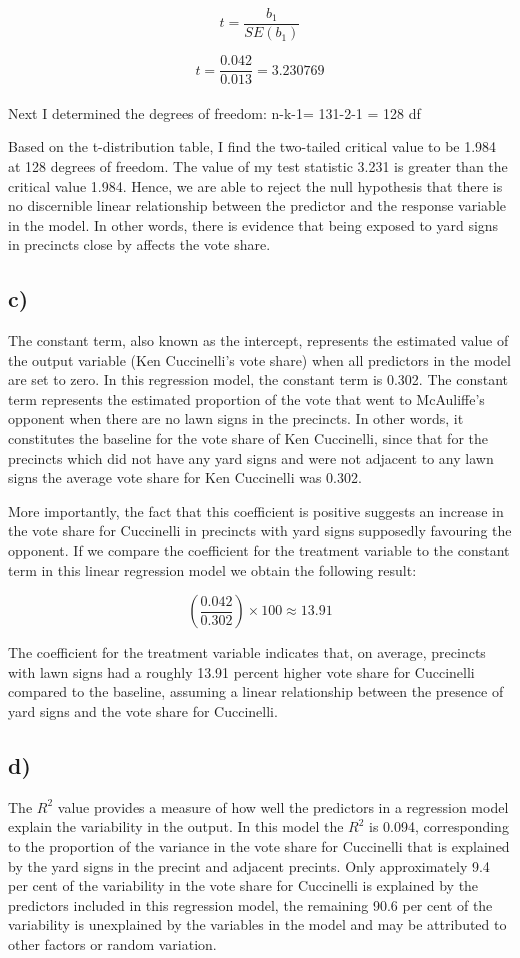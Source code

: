 \documentclass[oneside]{article}
\begin{document}
\[ t = \frac{b_1}{SE(b_1)} \]

\[ t = \frac{0.042}{0.013} = 3.230769\]
\\
Next I determined the degrees of freedom: n-k-1= 131-2-1 = 128 df

Based on the t-distribution table, I find the two-tailed critical value to be 1.984 at 128 degrees of freedom. The value of my test statistic 3.231 is greater than the critical value 1.984. Hence, we are able to reject the null hypothesis that there is no discernible linear relationship between the predictor and the response variable in the model. In other words, there is evidence that being exposed to yard signs in precincts close by affects the vote share.

\subsection*{c)}
The constant term, also known as the intercept, represents the estimated value of the output variable (Ken Cuccinelli's vote share) when all predictors in the model are set to zero. In this regression model, the constant term is 0.302. 
The constant term represents the estimated proportion of the vote that went to McAuliffe's opponent when there are no lawn signs in the precincts.
In other words, it constitutes the baseline for the vote share of Ken Cuccinelli, since that for the precincts which did not have any yard signs and were not adjacent to any lawn signs the average vote share for Ken Cuccinelli was 0.302.

More importantly, the fact that this coefficient is positive suggests an increase in the vote share for Cuccinelli in precincts with yard signs supposedly favouring the opponent. 
If we compare the coefficient for the treatment variable to the constant term in this linear regression model we obtain the following result:

\[
\left( \frac{0.042}{0.302} \right) \times 100 \approx 13.91
\]

The coefficient for the treatment variable indicates that, on average, precincts with lawn signs had a roughly 13.91 percent higher vote share for Cuccinelli compared to the baseline, assuming a linear relationship between the presence of yard signs and the vote share for Cuccinelli.

\subsection*{d)}

The $R^2$ value provides a measure of how well the predictors in a regression model explain the variability in the output. In this model the $R^2$ is 0.094, corresponding to the proportion of the variance in the vote share for Cuccinelli that is explained by the yard signs in the precint and adjacent precints. Only approximately 9.4 per cent of the variability in the vote share for Cuccinelli is explained by the predictors included in this regression model, the remaining 90.6 per cent of the variability is unexplained by the variables in the model and may be attributed to other factors or random variation.
\end{document}
